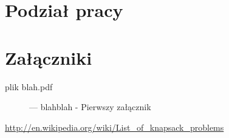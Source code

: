 \documentclass[a4paper,12pt,notitlepage]{mwrep}
\begin{document}
\chapter{Podział pracy}

\addtocounter{page}{-1}

\appendix
\chapter*{Załączniki}
\begin{description}
	\item[plik blah.pdf]	 --- blahblah - Pierwszy załącznik
\end{description}

\begin{thebibliography}{9}

	\href{http://en.wikipedia.org/wiki/List_of_knapsack_problems}{http://en.wikipedia.org/wiki/List\_of\_knapsack\_problems}

\end{thebibliography}


\listoffigures

\listoftables

\label{LastPage}
\end{document}
